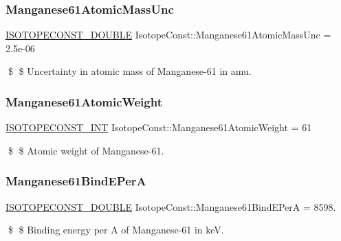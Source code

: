 \subsubsection{\texorpdfstring{Manganese61\+Atomic\+Mass\+Unc}{Manganese61AtomicMassUnc}}
{\footnotesize\ttfamily \mbox{\hyperlink{group___isotope_const-_macros_ga8f45a7272ce02c0b4c65c44636ed719a}{I\+S\+O\+T\+O\+P\+E\+C\+O\+N\+S\+T\+\_\+\+D\+O\+U\+B\+LE}} Isotope\+Const\+::\+Manganese61\+Atomic\+Mass\+Unc = 2.\+5e-\/06}

\$ \$ Uncertainty in atomic mass of Manganese-\/61 in amu. \mbox{\label{group___isotope_const-_manganese-_mn61_ga28545044664d03abf85470a0938335b6}} 
\subsubsection{\texorpdfstring{Manganese61\+Atomic\+Weight}{Manganese61AtomicWeight}}
{\footnotesize\ttfamily \mbox{\hyperlink{group___isotope_const-_macros_ga5f18360b3e99483a35c32d789e62621c}{I\+S\+O\+T\+O\+P\+E\+C\+O\+N\+S\+T\+\_\+\+I\+NT}} Isotope\+Const\+::\+Manganese61\+Atomic\+Weight = 61}

\$ \$ Atomic weight of Manganese-\/61. \mbox{\label{group___isotope_const-_manganese-_mn61_gae81b9c79ea58e9844ab00000b80620a3}} 
\subsubsection{\texorpdfstring{Manganese61\+Bind\+E\+PerA}{Manganese61BindEPerA}}
{\footnotesize\ttfamily \mbox{\hyperlink{group___isotope_const-_macros_ga8f45a7272ce02c0b4c65c44636ed719a}{I\+S\+O\+T\+O\+P\+E\+C\+O\+N\+S\+T\+\_\+\+D\+O\+U\+B\+LE}} Isotope\+Const\+::\+Manganese61\+Bind\+E\+PerA = 8598.}

\$ \$ Binding energy per A of Manganese-\/61 in keV. \mbox{\label{group___isotope_const-_manganese-_mn61_ga3ba71498ee25f4ab669a7fab72725384}} 
